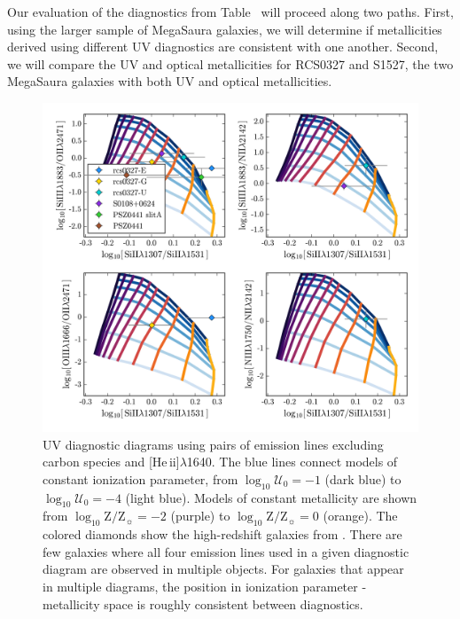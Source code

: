 \documentclass[preprint2]{aastex62}
\newcommand{\heii}{[He\,{\sc ii}]\xspace}
\newcommand{\logten}{\ensuremath{\log_{10}}}
\newcommand{\logZeq}[1]{\ensuremath{\logten \mathrm{Z}/\mathrm{Z}_{\sun} = #1}}
\newcommand{\logUeq}[1]{\ensuremath{\logten \mathcal{U}_0 = #1}}
\newcommand{\mage}{{\sc Meg}a{\sc S}a{\sc ura}\xspace}
\newcommand{\XXX}{{\bf \color{red}{XXX} }}
\begin{document}
Our evaluation of the diagnostics from Table~\XXX will proceed along two paths. First, using the larger sample of \mage galaxies, we will determine if metallicities derived using different UV diagnostics are consistent with one another. Second, we will compare the UV and optical metallicities for RCS0327 and S1527, the two \mage galaxies with both UV and optical metallicities.

\begin{figure}
  \begin{center}
    \includegraphics[width=\linewidth]{figs/f5.png}
    \caption{UV diagnostic diagrams using pairs of emission lines excluding carbon species and \heii$\lambda$1640.  The blue lines connect models of constant ionization parameter, from \logUeq{-1} (dark blue) to \logUeq{-4} (light blue). Models of constant metallicity are shown from \logZeq{-2} (purple) to \logZeq{0} (orange). The colored diamonds show the high-redshift galaxies from \citet{Rigby+2018b}. There are few galaxies where all four emission lines used in a given diagnostic diagram are observed in multiple objects. For galaxies that appear in multiple diagrams, the position in ionization parameter - metallicity space is roughly consistent between diagnostics.}
    \label{fig:UVSiO}
  \end{center}
\end{figure}
\end{document}
